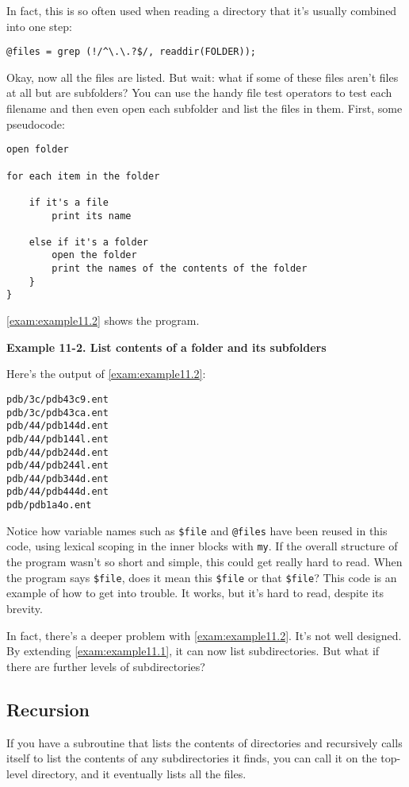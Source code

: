 In fact, this is so often used when reading a directory that it's usually combined into one step: 

\begin{lstlisting}
@files = grep (!/^\.\.?$/, readdir(FOLDER));
\end{lstlisting}

Okay, now all the files are listed. But wait: what if some of these files aren't files at all but are subfolders? You can use the handy file test operators to test each filename and then even open each subfolder and list the files in them. First, some pseudocode: 

\begin{lstlisting}
open folder

for each item in the folder

    if it's a file
        print its name

    else if it's a folder
        open the folder
        print the names of the contents of the folder
    }
}
\end{lstlisting}

\autoref{exam:example11.2} shows the program.

\textbf{Example 11-2. List contents of a folder and its subfolders}


Here's the output of \autoref{exam:example11.2}:

\begin{lstlisting}
pdb/3c/pdb43c9.ent
pdb/3c/pdb43ca.ent
pdb/44/pdb144d.ent
pdb/44/pdb144l.ent
pdb/44/pdb244d.ent
pdb/44/pdb244l.ent
pdb/44/pdb344d.ent
pdb/44/pdb444d.ent
pdb/pdb1a4o.ent
\end{lstlisting}

Notice how variable names such as \verb|$file| and \verb|@files| have been reused in this code, using lexical scoping in the inner blocks with \verb|my|. If the overall structure of the program wasn't so short and simple, this could get really hard to read. When the program says \verb|$file|, does it mean this \verb|$file| or that \verb|$file|? This code is an example of how to get into trouble. It works, but it's hard to read, despite its brevity.

In fact, there's a deeper problem with \autoref{exam:example11.2}. It's not well designed. By extending \autoref{exam:example11.1}, it can now list subdirectories. But what if there are further levels of subdirectories? 

\subsection{Recursion}
If you have a subroutine that lists the contents of directories and recursively calls itself to list the contents of any subdirectories it finds, you can call it on the top-level directory, and it eventually lists all the files.

